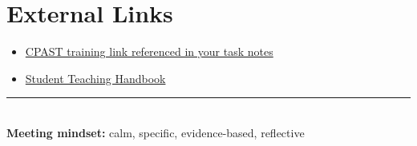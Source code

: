 \documentclass[11pt]{article}
\newcommand{\weblink}[2]{\href{#1}{#2}}
\begin{document}
\section{External Links}

\begin{itemize}[leftmargin=*]
  \item \weblink{https://osu.az1.qualtrics.com/jfe/form/SV_cC8iDwgJ6JKLl7D}{CPAST training link referenced in your task notes}
  \item \weblink{https://www.warner.rochester.edu/sites/default/files/2025-09/StudentTeachingHandbook\%20-\%202025-26.pdf}{Student Teaching Handbook}
\end{itemize}

\vfill
\begin{center}
\color{cpastgold}\rule{0.7\linewidth}{0.8pt}\\
\textbf{Meeting mindset:} calm, specific, evidence-based, reflective
\end{center}
\end{document}

